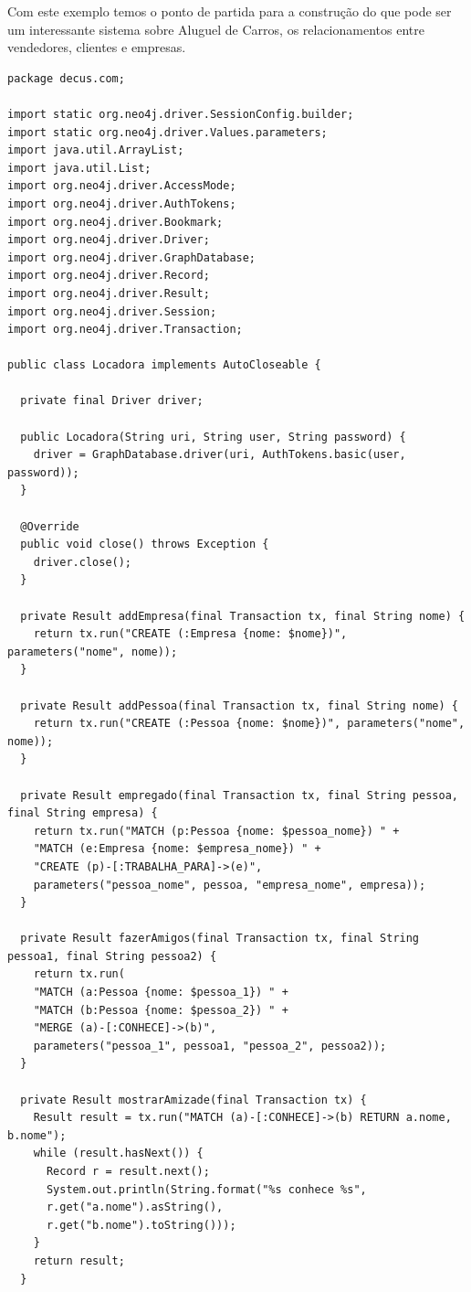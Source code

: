 Com este exemplo temos o ponto de partida para a construção do que pode ser um interessante sistema sobre Aluguel de Carros, os relacionamentos entre vendedores, clientes e empresas.
\begin{lstlisting}[]
package decus.com;

import static org.neo4j.driver.SessionConfig.builder;
import static org.neo4j.driver.Values.parameters;
import java.util.ArrayList;
import java.util.List;
import org.neo4j.driver.AccessMode;
import org.neo4j.driver.AuthTokens;
import org.neo4j.driver.Bookmark;
import org.neo4j.driver.Driver;
import org.neo4j.driver.GraphDatabase;
import org.neo4j.driver.Record;
import org.neo4j.driver.Result;
import org.neo4j.driver.Session;
import org.neo4j.driver.Transaction;

public class Locadora implements AutoCloseable {

  private final Driver driver;
  
  public Locadora(String uri, String user, String password) {
    driver = GraphDatabase.driver(uri, AuthTokens.basic(user, password));
  }

  @Override
  public void close() throws Exception {
    driver.close();
  }

  private Result addEmpresa(final Transaction tx, final String nome) {
    return tx.run("CREATE (:Empresa {nome: $nome})", parameters("nome", nome));
  }

  private Result addPessoa(final Transaction tx, final String nome) {
    return tx.run("CREATE (:Pessoa {nome: $nome})", parameters("nome", nome));
  }

  private Result empregado(final Transaction tx, final String pessoa, final String empresa) {
    return tx.run("MATCH (p:Pessoa {nome: $pessoa_nome}) " +
    "MATCH (e:Empresa {nome: $empresa_nome}) " +
    "CREATE (p)-[:TRABALHA_PARA]->(e)",
    parameters("pessoa_nome", pessoa, "empresa_nome", empresa));
  }

  private Result fazerAmigos(final Transaction tx, final String pessoa1, final String pessoa2) {
    return tx.run(
    "MATCH (a:Pessoa {nome: $pessoa_1}) " +
    "MATCH (b:Pessoa {nome: $pessoa_2}) " +
    "MERGE (a)-[:CONHECE]->(b)",
    parameters("pessoa_1", pessoa1, "pessoa_2", pessoa2));
  }

  private Result mostrarAmizade(final Transaction tx) {
    Result result = tx.run("MATCH (a)-[:CONHECE]->(b) RETURN a.nome, b.nome");
    while (result.hasNext()) {
      Record r = result.next();
      System.out.println(String.format("%s conhece %s",
      r.get("a.nome").asString(),
      r.get("b.nome").toString()));
    }
    return result;
  }


\end{lstlisting}

